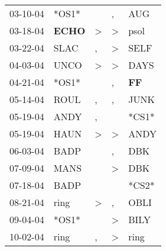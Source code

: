 \begin{supertabular}{p{0.07\textwidth}p{0.06\textwidth}p{0.02\textwidth}p{0.02\textwidth}p{0.06\textwidth}}
          03-10-04\textsuperscript{} &                            *OS1* &                  &                , &            AUG\textsuperscript{} \\
          03-18-04\textsuperscript{} &  \textbf{ECHO\textsuperscript{}} &     \textgreater &     \textgreater &           psol\textsuperscript{} \\
          03-22-04\textsuperscript{} &           SLAC\textsuperscript{} &                , &     \textgreater &           SELF\textsuperscript{} \\
          04-03-04\textsuperscript{} &           UNCO\textsuperscript{} &     \textgreater &     \textgreater &           DAYS\textsuperscript{} \\
          04-21-04\textsuperscript{} &                            *OS1* &                  &                , &    \textbf{FF\textsuperscript{}} \\
          05-14-04\textsuperscript{} &           ROUL\textsuperscript{} &                , &                , &           JUNK\textsuperscript{} \\
          05-19-04\textsuperscript{} &           ANDY\textsuperscript{} &                , &                  &                            *CS1* \\
          05-19-04\textsuperscript{} &           HAUN\textsuperscript{} &     \textgreater &     \textgreater &           ANDY\textsuperscript{} \\
          06-03-04\textsuperscript{} &           BADP\textsuperscript{} &                  &                , &            DBK\textsuperscript{} \\
          07-09-04\textsuperscript{} &           MANS\textsuperscript{} &                  &     \textgreater &            DBK\textsuperscript{} \\
          07-18-04\textsuperscript{} &           BADP\textsuperscript{} &                  &                  &                            *CS2* \\
          08-21-04\textsuperscript{} &           ring\textsuperscript{} &     \textgreater &                , &           OBLI\textsuperscript{} \\
          09-04-04\textsuperscript{} &                            *OS1* &                  &     \textgreater &           BILY\textsuperscript{} \\
          10-02-04\textsuperscript{} &           ring\textsuperscript{} &                , &     \textgreater &           ring\textsuperscript{} \\

\end{supertabular}
